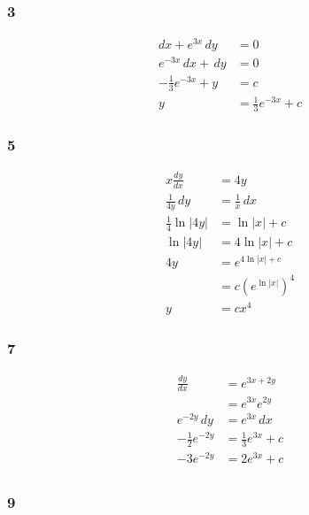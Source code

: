 \documentclass{article}
\begin{document}
\subsubsection{3}

\begin{align*}
  d x + e^{3 x} \,d y       & = 0                        \\
  e^{-3 x} \,d x + \,d y    & = 0                        \\
  -\frac{1}{3} e^{-3 x} + y & = c                        \\
  y                         & = \frac{1}{3} e^{-3 x} + c
\end{align*}

\subsubsection{5}

\begin{align*}
  x \frac{d y}{d x}     & = 4 y                            \\
  \frac{1}{4 y} \,d y   & = \frac{1}{x} \,d x              \\
  \frac{1}{4} \ln |4 y| & = \ln |x| + c                    \\
  \ln |4 y|             & = 4 \ln |x| + c                  \\
  4 y                   & = e^{4 \ln |x| + c}              \\
                        & = c \left( e^{\ln |x|} \right)^4 \\
  y                     & = c x^4
\end{align*}

\subsubsection{7}

\begin{align*}
  \frac{d y}{d x}       & = e^{3 x + 2 y}           \\
                        & = e^{3 x} e^{2 y}         \\
  e^{-2 y} \,d y        & = e^{3 x} \,d x           \\
  -\frac{1}{2} e^{-2 y} & = \frac{1}{3} e^{3 x} + c \\
  -3 e^{-2 y}           & = 2 e^{3 x} + c           \\
\end{align*}

\subsubsection{9}
\end{document}
